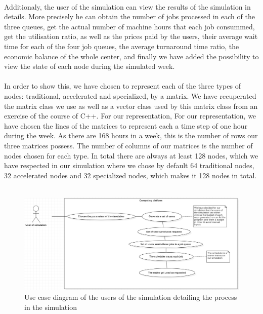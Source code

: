 \documentclass [10 pt, a4 paper]{report}
\begin{document}
\\
\noindent
Additionaly, the user of the simulation can view the results of the simulation in details. More precisely he can obtain the number of jobs processed in each of the three queues, get the actual number of machine hours that each job consummed, get the utilisation ratio, as well as the prices paid by the users, their average wait time for each of the four job queues, the average turnaround time ratio, the economic balance of the whole center, and finally we have added the possibility to view the state of each node during the simulated week. 
\\ \\
In order to show this, we have chosen to represent each of the three types of nodes: traditional, accelerated and specialized, by a matrix. We have recuperated the matrix class we use as well as a vector class used by this matrix class from an exercise of the course of C++. For our representation, For our representation, we have chosen the lines of the matrices to represent each a time step of one hour during the week. As there are 168 hours in a week, this is the number of rows our three matrices possess. The number of columns of our matrices is the number of nodes chosen for each type. In total there are always at least 128 nodes, which we have respected in our simulation where we chose by default 64 traditional nodes, 32 accelerated nodes and 32 specialized nodes, which makes it 128 nodes in total.
\\ \\

\begin{figure}[!htbp]
\centering
\includegraphics[width=1.2\textwidth]{UCD5.jpg}
\caption{\label{fig:image} Use case diagram of the users of the simulation detailing the process in the simulation}
\end{figure}
\\
\end{document}
